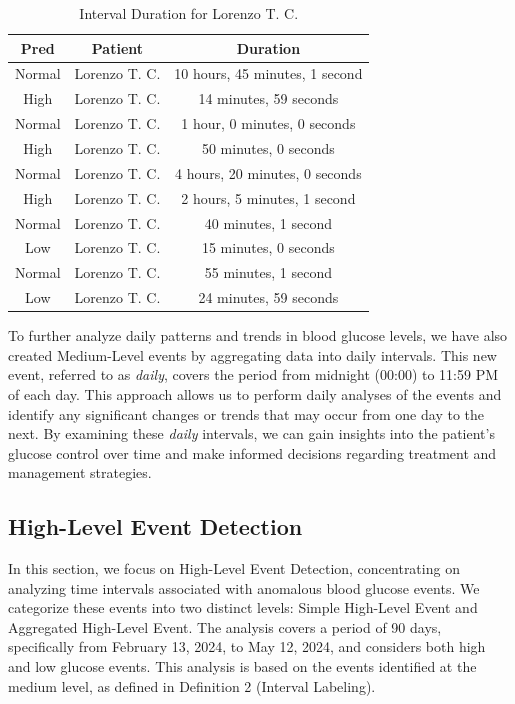 \documentclass{article}
\begin{document}
\begin{table}[h!]
    \centering
    \begin{tabular}{|c|c|c|}
        \hline
        \textbf{Pred} & \textbf{Patient} & \textbf{Duration} \\
        \hline
        Normal & Lorenzo T. C. & 10 hours, 45 minutes, 1 second \\
        High & Lorenzo T. C. & 14 minutes, 59 seconds \\
        Normal & Lorenzo T. C. & 1 hour, 0 minutes, 0 seconds \\
        High & Lorenzo T. C. & 50 minutes, 0 seconds \\
        Normal & Lorenzo T. C. & 4 hours, 20 minutes, 0 seconds \\
        High & Lorenzo T. C. & 2 hours, 5 minutes, 1 second \\
        Normal & Lorenzo T. C. & 40 minutes, 1 second \\
        Low & Lorenzo T. C. & 15 minutes, 0 seconds \\
        Normal & Lorenzo T. C. & 55 minutes, 1 second \\
        Low & Lorenzo T. C. & 24 minutes, 59 seconds \\
        \hline
    \end{tabular}
    \caption{Interval Duration for Lorenzo T. C.}
    \label{tab:durations}
\end{table}

To further analyze daily patterns and trends in blood glucose levels, we have also created Medium-Level events by aggregating data into daily intervals. This new event, referred to as \textit{daily}, covers the period from midnight (00:00) to 11:59 PM of each day. This approach allows us to perform daily analyses of the events and identify any significant changes or trends that may occur from one day to the next. By examining these \textit{daily} intervals, we can gain insights into the patient's glucose control over time and make informed decisions regarding treatment and management strategies.

\subsection{High-Level Event Detection}

In this section, we focus on High-Level Event Detection, concentrating on analyzing time intervals associated with anomalous blood glucose events. We categorize these events into two distinct levels: Simple High-Level Event and Aggregated High-Level Event. The analysis covers a period of 90 days, specifically from February 13, 2024, to May 12, 2024, and considers both high and low glucose events. This analysis is based on the events identified at the medium level, as defined in Definition 2 (Interval Labeling).
\end{document}
